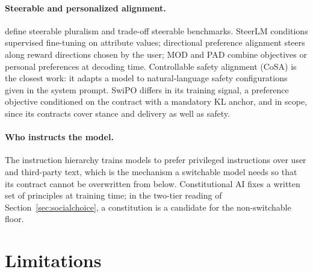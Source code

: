 \documentclass[letterpaper]{article} %
\begin{document}
\paragraph{Steerable and personalized alignment.}
\citet{sorensen2024roadmap} define steerable pluralism and trade-off steerable benchmarks. SteerLM \cite{dong2023steerlm} conditions supervised fine-tuning on attribute values; directional preference alignment \cite{wang-etal-2024-arithmetic} steers along reward directions chosen by the user; MOD \cite{shi2024decodingtime} and PAD \cite{chen2025pad} combine objectives or personal preferences at decoding time. Controllable safety alignment (CoSA) \cite{zhang2025cosa} is the closest work: it adapts a model to natural-language safety configurations given in the system prompt. SwiPO differs in its training signal, a preference objective conditioned on the contract with a mandatory KL anchor, and in scope, since its contracts cover stance and delivery as well as safety.

\paragraph{Who instructs the model.}
The instruction hierarchy \cite{wallace2024instruction} trains models to prefer privileged instructions over user and third-party text, which is the mechanism a switchable model needs so that its contract cannot be overwritten from below. Constitutional AI \cite{bai2022constitutional} fixes a written set of principles at training time; in the two-tier reading of Section~\ref{sec:socialchoice}, a constitution is a candidate for the non-switchable floor.

\section{Limitations}
\end{document}
